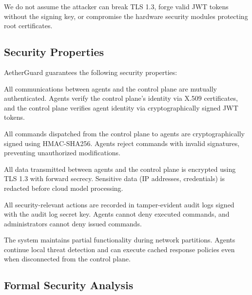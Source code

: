 We do not assume the attacker can break TLS 1.3, forge valid JWT tokens without the signing key, or compromise the hardware security modules protecting root certificates.

\subsection{Security Properties}
\label{subsec:security-properties}

AetherGuard guarantees the following security properties:

\begin{property}[Authentication]
\label{prop:authentication}
All communications between agents and the control plane are mutually authenticated. Agents verify the control plane's identity via X.509 certificates, and the control plane verifies agent identity via cryptographically signed JWT tokens.
\end{property}

\begin{property}[Integrity]
\label{prop:integrity}
All commands dispatched from the control plane to agents are cryptographically signed using HMAC-SHA256. Agents reject commands with invalid signatures, preventing unauthorized modifications.
\end{property}

\begin{property}[Confidentiality]
\label{prop:confidentiality}
All data transmitted between agents and the control plane is encrypted using TLS 1.3 with forward secrecy. Sensitive data (IP addresses, credentials) is redacted before cloud model processing.
\end{property}

\begin{property}
\label{prop:non-repudiation}
All security-relevant actions are recorded in tamper-evident audit logs signed with the audit log secret key. Agents cannot deny executed commands, and administrators cannot deny issued commands.
\end{property}

\begin{property}[Availability]
\label{prop:availability}
The system maintains partial functionality during network partitions. Agents continue local threat detection and can execute cached response policies even when disconnected from the control plane.
\end{property}

\subsection{Formal Security Analysis}
\label{subsec:formal-analysis}

